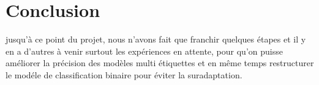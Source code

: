 \section*{Conclusion}
jusqu'à ce point du projet, nous n'avons fait que franchir quelques étapes et il y en a d'autres à venir surtout les expériences en attente, pour qu'on puisse améliorer la précision des modèles multi étiquettes et en même temps restructurer le modéle de classification binaire pour éviter la suradaptation.

